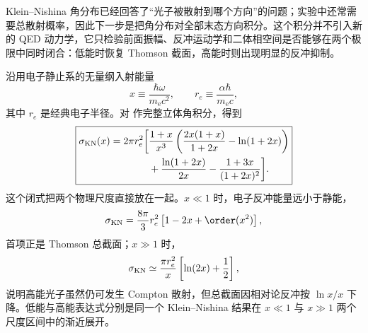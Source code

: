 
Klein--Nishina 角分布已经回答了“光子被散射到哪个方向”的问题；实验中还常需要总散射概率，因此下一步是把角分布对全部末态方向积分。这个积分并不引入新的 QED 动力学，它只检验前面振幅、反冲运动学和二体相空间是否能够在两个极限中同时闭合：低能时恢复 Thomson 截面，高能时则出现明显的反冲抑制。

沿用电子静止系的无量纲入射能量
\begin{equation*}
 x\equiv\frac{\hbar\omega}{m_{\mathrm e} c^2},
 \qquad
 r_e\equiv\frac{\alpha\hbar}{m_{\mathrm e} c},
\end{equation*}
其中 $r_e$ 是经典电子半径。对 作完整立体角积分，得到
\begin{equation}
 \boxed{
 \begin{aligned}
 \sigma_{\rm KN}(x)=2\pi r_e^2\bigg[&
 \frac{1+x}{x^3}
 \left(
 \frac{2x(1+x)}{1+2x}-\ln(1+2x)
 \right)\\
 &+\frac{\ln(1+2x)}{2x}
 -\frac{1+3x}{(1+2x)^2}
 \bigg].
 \end{aligned}}
 \label{eq:KN-total-r6}
\end{equation}
这个闭式把两个物理尺度直接放在一起。$x\ll1$ 时，电子反冲能量远小于静能，
\begin{equation}
 \sigma_{\rm KN}
 =\frac{8\pi}{3}r_e^2
 \left[1-2x+\order(x^2)\right],
 \label{eq:KN-low-energy-dp49}
\end{equation}
首项正是 Thomson 总截面；$x\gg1$ 时，
\begin{equation}
 \sigma_{\rm KN}
 \simeq
 \frac{\pi r_e^2}{x}
 \left[\ln(2x)+\frac12\right],
 \label{eq:KN-high-energy-dp49}
\end{equation}
说明高能光子虽然仍可发生 Compton 散射，但总截面因相对论反冲按 $\ln x/x$ 下降。低能与高能表达式分别是同一个 Klein--Nishina 结果在 $x\ll1$ 与 $x\gg1$ 两个尺度区间中的渐近展开。

